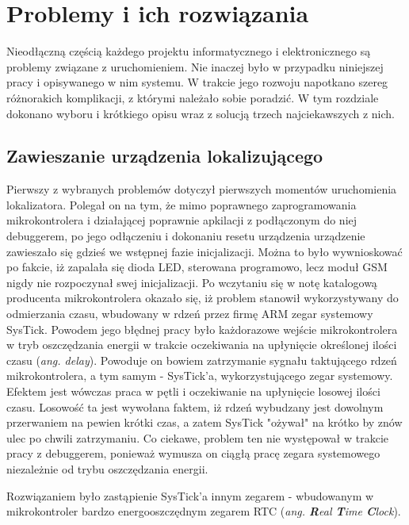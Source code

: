 \chapter{Problemy i ich rozwiązania}
\label{problems_and_solutions}

Nieodłączną częścią każdego projektu informatycznego i elektronicznego są problemy związane z uruchomieniem. Nie inaczej było w przypadku niniejszej pracy i opisywanego w nim systemu. W trakcie jego rozwoju napotkano szereg różnorakich komplikacji, z którymi należało sobie poradzić. W tym rozdziale dokonano wyboru i krótkiego opisu wraz z solucją trzech najciekawszych z nich.


\section{Zawieszanie urządzenia lokalizującego}

Pierwszy z wybranych problemów dotyczył pierwszych momentów uruchomienia lokalizatora. Polegał on na tym, że mimo poprawnego zaprogramowania mikrokontrolera i działającej poprawnie apkilacji z podłączonym do niej debuggerem, po jego odłączeniu i dokonaniu resetu urządzenia urządzenie zawieszało się gdzieś we wstępnej fazie inicjalizacji. Można to było wywnioskować po fakcie, iż zapalała się dioda LED, sterowana programowo, lecz moduł GSM nigdy nie rozpoczynał swej inicjalizacji. Po wczytaniu się w notę katalogową producenta mikrokontrolera okazało się, iż problem stanowił wykorzystywany do odmierzania czasu, wbudowany w rdzeń przez firmę ARM zegar systemowy SysTick. Powodem jego błędnej pracy było każdorazowe wejście mikrokontrolera w tryb oszczędzania energii w trakcie oczekiwania na upłynięcie określonej ilości czasu (\textit{ang. delay}). Powoduje on bowiem zatrzymanie sygnału taktującego rdzeń mikrokontrolera, a tym samym - SysTick'a, wykorzystującego zegar systemowy. Efektem jest wówczas praca w pętli i oczekiwanie na upłynięcie losowej ilości czasu. Losowość ta jest wywołana faktem, iż rdzeń wybudzany jest dowolnym przerwaniem na pewien krótki czas, a zatem SysTick "ożywał" na krótko by znów ulec po chwili zatrzymaniu. Co ciekawe, problem ten nie występował w trakcie pracy z debuggerem, ponieważ wymusza on ciągłą pracę zegara systemowego niezależnie od trybu oszczędzania energii. 

Rozwiązaniem było zastąpienie SysTick'a innym zegarem - wbudowanym w mikrokontroler bardzo energooszczędnym zegarem RTC (\textit{ang. \textbf{R}eal \textbf{T}ime \textbf{C}lock}).

